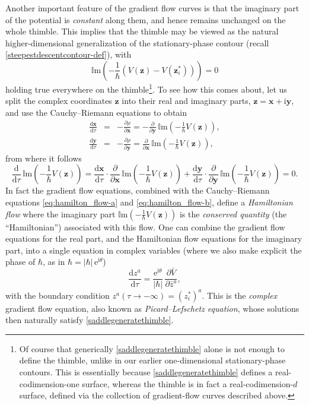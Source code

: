 \documentclass[11pt,a4paper]{article}
\newcommand{\be}{\begin{equation}}
\newcommand{\ee}{\end{equation}}
\def\im{{\mathbb{I}}{\mathrm{m}}}
\newcommand{\rme}{{\mathrm{e}}}
\newcommand{\rmi}{{\mathrm{i}}}
\newcommand{\rmd}{{\mathrm{d}}}
\begin{document}
Another important feature of the gradient flow curves is that the imaginary part of the potential is \textit{constant} along them, and hence remains unchanged on the whole thimble. This implies that the thimble may be viewed as the natural higher-dimensional generalization of the stationary-phase contour (recall \eqref{steepestdescentcontour-def}), with
%
\be
\label{saddlegeneratethimble}
\im \left( - \frac{1}{\hbar} \left( V(\boldsymbol{z}) - V(\boldsymbol{z}^*_i) \right) \right) = 0
\ee
%
\noindent
holding true everywhere on the thimble\footnote{Of course that generically \eqref{saddlegeneratethimble} alone is not enough to define the thimble, unlike in our earlier one-dimensional stationary-phase contours. This is essentially because \eqref{saddlegeneratethimble} defines a real-codimension-one surface, whereas the thimble is in fact a real-codimension-$d$ surface, defined via the collection of gradient-flow curves described above.}. To see how this comes about, let us split the complex coordinates $\boldsymbol{z}$ into their real and imaginary parts, $\boldsymbol{z} = \boldsymbol{x} + \rmi \boldsymbol{y}$, and use the Cauchy--Riemann equations to obtain
%
\begin{eqnarray}
\label{eq:hamilton_flow-a}
\frac{\rmd\boldsymbol{x}}{\rmd\tau} &=& - \frac{\partial\rho}{\partial\boldsymbol{x}} = - \frac{\partial}{\partial\boldsymbol{y}}\, \im \left( - \frac{1}{\hbar} V (\boldsymbol{z}) \right), \\
\label{eq:hamilton_flow-b}
\frac{\rmd\boldsymbol{y}}{\rmd\tau} &=& - \frac{\partial\rho}{\partial\boldsymbol{y}} = \frac{\partial}{\partial\boldsymbol{x}}\, \im \left( - \frac{1}{\hbar} V (\boldsymbol{z}) \right),
\end{eqnarray}
%
\noindent
from where it follows
%
\begin{equation}
\frac{\rmd}{\rmd\tau}\, \im \left( - \frac{1}{\hbar} V (\boldsymbol{z}) \right) = \frac{\rmd\boldsymbol{x}}{\rmd\tau} \cdot \frac{\partial}{\partial\boldsymbol{x}}\, \im \left( - \frac{1}{\hbar} V (\boldsymbol{z}) \right) + \frac{\rmd\boldsymbol{y}}{\rmd\tau} \cdot \frac{\partial}{\partial\boldsymbol{y}}\, \im \left( - \frac{1}{\hbar} V (\boldsymbol{z}) \right) = 0.
\end{equation}
%
\noindent
In fact the gradient flow equations, combined with the Cauchy--Riemann equations \eqref{eq:hamilton_flow-a} and \eqref{eq:hamilton_flow-b}, define a \textit{Hamiltonian flow} where the imaginary part $\im \left( - \frac{1}{\hbar} V (\boldsymbol{z}) \right)$ is the \textit{conserved quantity} (the ``Hamiltonian'') associated with this flow. One can combine the gradient flow equations for the real part, and the Hamiltonian flow equations for the imaginary part, into a single equation in complex variables (where we also make explicit the phase of $\hbar$, as in $\hbar = |\hbar|\, \rme^{\rmi\theta}$)
%
\be
\label{eq:gradient_flow_complex}
\frac{\rmd z^a}{\rmd\tau} = \frac{\rme^{\rmi\theta}}{|\hbar|}\, \frac{\partial\bar{V}}{\partial\bar{z}^a},
\ee
%
\noindent
with the boundary condition $z^a (\tau\to-\infty) = (z^*_i)^a$. This is the \textit{complex} gradient flow equation, also known as \textit{Picard--Lefschetz equation}, whose solutions then naturally satisfy \eqref{saddlegeneratethimble}.
\end{document}

